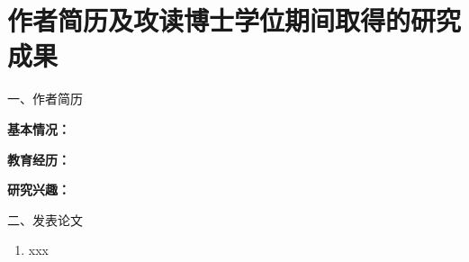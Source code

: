 	\chapter*{作者简历及攻读博士学位期间取得的研究成果}
	
一、作者简历

	\textbf{基本情况：}
	 

	\textbf{教育经历：}
	
 
	
	\textbf{研究兴趣：}
	 
	
	
二、发表论文
	\setlength\leftmargini{3.5em}
	\renewcommand\labelenumi{[\theenumi]}
	\begin{enumerate}
 	\item xxx
	\end{enumerate}

%
